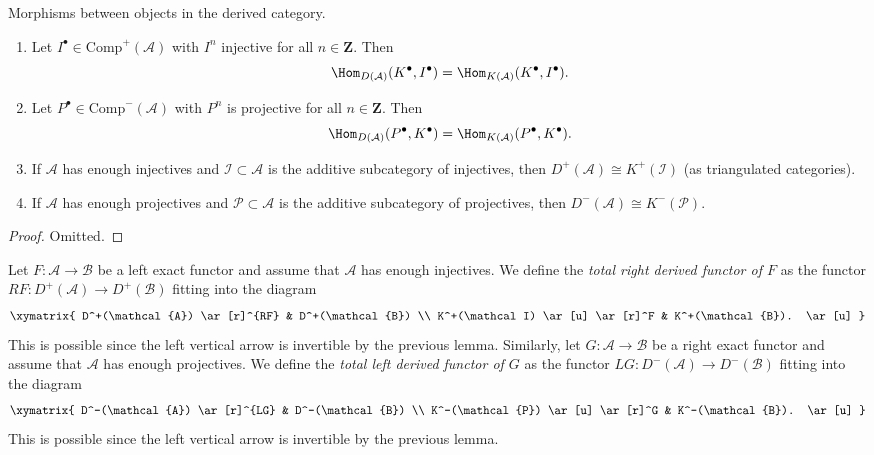 \begin{lemma}
\label{lemma-derived-categories}
Morphisms between objects in the derived category.
\begin{enumerate}
\item
Let $I^\bullet \in \text{Comp}^+(\mathcal{A})$ with $I^n$ injective for all
$n \in \mathbf{Z}$. Then
$$
\Hom_{D(\mathcal{A})}(K^\bullet, I^\bullet)
=
\Hom_{K(\mathcal{A})}(K^\bullet, I^\bullet).
$$
\item
Let $P^\bullet \in \text{Comp}^-(\mathcal{A})$ with $P^n$ is projective for all
$n \in \mathbf{Z}$. Then
$$
\Hom_{D(\mathcal{A})}(P^\bullet, K^\bullet)
=
\Hom_{K(\mathcal{A})}(P^\bullet, K^\bullet).
$$
\item
If $\mathcal{A}$ has enough injectives and $\mathcal{I} \subset \mathcal{A}$
is the additive subcategory of injectives, then
$
D^+(\mathcal{A})\cong K^+(\mathcal{I})
$
(as triangulated categories).
\item
If $\mathcal{A}$ has enough projectives and $\mathcal{P} \subset \mathcal{A}$
is the additive subcategory of projectives, then
$
D^-(\mathcal{A}) \cong K^-(\mathcal{P}).
$
\end{enumerate}
\end{lemma}

\begin{proof}
Omitted.
\end{proof}

\begin{definition}
\label{definition-derived-functor}
Let $F: \mathcal{A} \to \mathcal{B}$ be a left exact functor and assume that
$\mathcal{A}$ has enough injectives. We define the {\it total right derived
functor of $F$} as the functor $RF: D^+(\mathcal{A}) \to D^+(\mathcal{B})$
fitting into the diagram
$$
\xymatrix{
D^+(\mathcal{A}) \ar[r]^{RF} & D^+(\mathcal{B}) \\
K^+(\mathcal I) \ar[u] \ar[r]^F & K^+(\mathcal{B}). \ar[u]
}
$$
This is possible since the left vertical arrow is invertible by the previous
lemma. Similarly, let $G: \mathcal{A} \to \mathcal{B}$ be a right exact
functor and assume that $\mathcal{A}$ has enough projectives. We define the
{\it total left derived functor of $G$} as the functor $LG: D^-(\mathcal{A})
\to D^-(\mathcal{B})$ fitting into the diagram
$$
\xymatrix{
D^-(\mathcal{A}) \ar[r]^{LG} & D^-(\mathcal{B}) \\
K^-(\mathcal{P}) \ar[u] \ar[r]^G & K^-(\mathcal{B}). \ar[u]
}
$$
This is possible since the left vertical arrow is invertible by the previous
lemma.
\end{definition}

